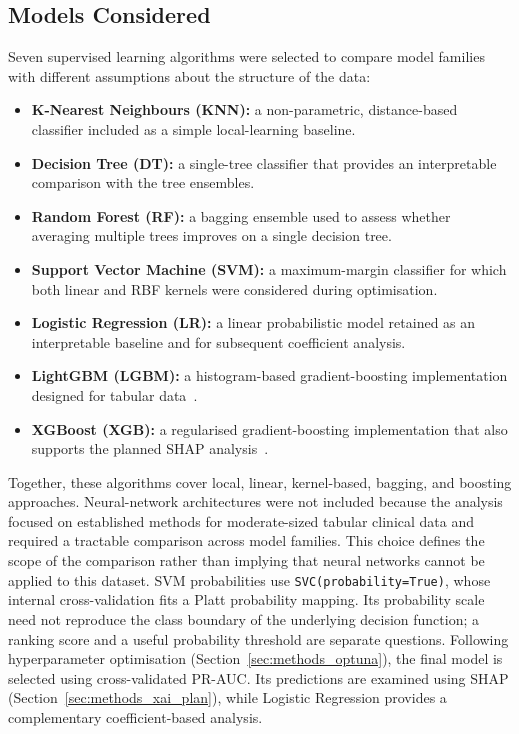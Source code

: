 \subsection{Models Considered}
\label{sec:methods_models}
Seven supervised learning algorithms were selected to compare model families with different assumptions about the structure of the data:
\begin{itemize}
  \item \textbf{K-Nearest Neighbours (\gls{KNN}):} a non-parametric, distance-based classifier included as a simple local-learning baseline.
  \item \textbf{Decision Tree (\gls{DT}):} a single-tree classifier that provides an interpretable comparison with the tree ensembles.
  \item \textbf{Random Forest (\gls{RF}):} a bagging ensemble used to assess whether averaging multiple trees improves on a single decision tree.
  \item \textbf{Support Vector Machine (\gls{SVM}):} a maximum-margin classifier for which both linear and \gls{RBF} kernels were considered during optimisation.
  \item \textbf{Logistic Regression (\gls{LR}):} a linear probabilistic model retained as an interpretable baseline and for subsequent coefficient analysis.
  \item \textbf{LightGBM (\gls{LGBM}):} a histogram-based gradient-boosting implementation designed for tabular data~\cite{ke2017lightgbm}.
  \item \textbf{XGBoost (\gls{XGB}):} a regularised gradient-boosting implementation that also supports the planned \gls{SHAP} analysis~\cite{chen2016xgboost}.
\end{itemize}
Together, these algorithms cover local, linear, kernel-based, bagging, and boosting approaches. Neural-network architectures were not included because the analysis focused on established methods for moderate-sized tabular clinical data and required a tractable comparison across model families. This choice defines the scope of the comparison rather than implying that neural networks cannot be applied to this dataset.
SVM probabilities use \texttt{SVC(probability=True)}, whose internal cross-validation fits a Platt probability mapping. Its probability scale need not reproduce the class boundary of the underlying decision function; a ranking score and a useful probability threshold are separate questions.
Following hyperparameter optimisation (Section~\ref{sec:methods_optuna}), the final model is selected using cross-validated \gls{PR-AUC}. Its predictions are examined using \gls{SHAP} (Section~\ref{sec:methods_xai_plan}), while Logistic Regression provides a complementary coefficient-based analysis.

